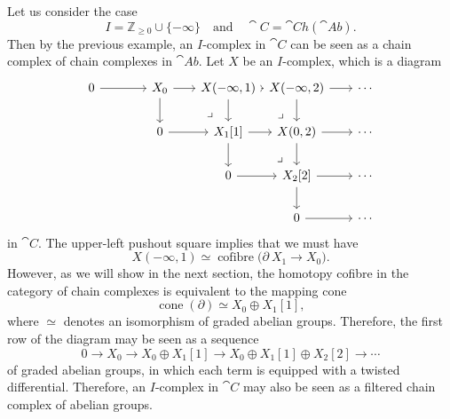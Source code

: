 \begin{example}
    Let us consider the case
    \[I=\mathbb{Z}_{\geq0}\cup\{-\infty\}\quad\text{and}\quad
    \cat{C}=\cat{Ch}(\cat{Ab}).\]
    Then by the previous example, 
    an $I$-complex in $\cat{C}$ can be seen as
    a chain complex of chain complexes in $\cat{Ab}$.
    Let $X$ be an $I$-complex, which is a diagram 
    \[\begin{tikzcd}[column sep={5.5em,between origins}]
        0\ar[r] & X_0\ar[r]\ar[d]\ar[dr,phantom,end anchor={[xshift=-.5em]north},pos=.75,"\lrcorner"] &
        X(-\infty,1)\ar[r]\ar[d]\ar[dr,phantom,end anchor={[xshift=-.5em]north},pos=.75,"\lrcorner"] &
        X(-\infty,2)\ar[r]\ar[d] & \cdots \\
        & 0\ar[r] & X_1[1]\ar[r]\ar[d]\ar[dr,phantom,end anchor={[xshift=-.5em]north},pos=.75,"\lrcorner"] &
        X(0,2) \ar[r]\ar[d] & \cdots \\
        && 0\ar[r] & X_2[2]\ar[r]\ar[d] & \cdots \\
        &&& 0\ar[r] & \cdots
    \end{tikzcd}\]
    in $\cat{C}$. The upper-left pushout square implies that we must have
    \[X(-\infty,1)\simeq\operatorname{cofibre}\bigl(\partial\:X_1\to X_0\bigr).\]
    However, as we will show in the next section,
    the homotopy cofibre in the category of chain complexes 
    is equivalent to the mapping cone
    \[\operatorname{cone}(\partial)\simeq X_0\oplus X_1[1],\]
    where $\simeq$ denotes an isomorphism of graded abelian groups.
    Therefore, the first row of the diagram may be seen as a sequence 
    \[0\to X_0\to X_0\oplus X_1[1]\to X_0\oplus X_1[1]\oplus X_2[2]\to\cdots\]
    of graded abelian groups,
    in which each term is equipped with a twisted differential.
    Therefore, an $I$-complex in $\cat{C}$
    may also be seen as a filtered chain complex 
    of abelian groups. \varqed
\end{example}
